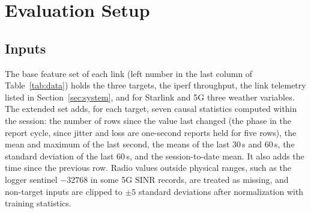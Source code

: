 \section{Evaluation Setup}
\label{sec:setup}
\subsection{Inputs}
The base feature set of each link (left number in the last column of Table~\ref{tab:data}) holds the three targets, the iperf throughput, the link telemetry listed in Section~\ref{sec:system}, and for Starlink and 5G three weather variables. The extended set adds, for each target, seven causal statistics computed within the session: the number of rows since the value last changed (the phase in the report cycle, since jitter and loss are one-second reports held for five rows), the mean and maximum of the last second, the means of the last 30\,s and 60\,s, the standard deviation of the last 60\,s, and the session-to-date mean. It also adds the time since the previous row. Radio values outside physical ranges, such as the logger sentinel $-32768$ in some 5G SINR records, are treated as missing, and non-target inputs are clipped to $\pm 5$ standard deviations after normalization with training statistics.

